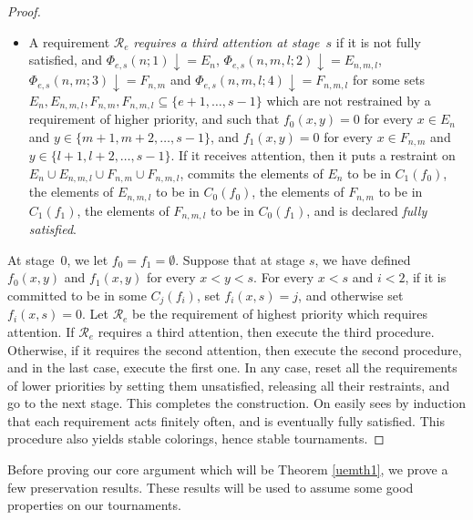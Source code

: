 \documentclass{amsart}
\theoremstyle{definition}
\theoremstyle{remark}
\numberwithin{equation}{section}
\theoremstyle{noparens}
\newcommand{\Rcal}{\mathcal{R}}
\begin{document}
\begin{proof}
\begin{itemize}
	\item[(iii)] A requirement $\Rcal_e$ \emph{requires a third attention at stage~$s$}
	if it is not fully satisfied, and $\Phi_{e,s}(n;1) \downarrow = E_n$, $\Phi_{e,s}(n, m, l;2) \downarrow = E_{n,m,l}$, $\Phi_{e,s}(n,m;3) \downarrow = F_{n,m}$ and $\Phi_{e,s}(n,m,l;4) \downarrow = F_{n,m,l}$
	for some sets $E_n, E_{n,m,l}, F_{n,m}, F_{n,m,l} \subseteq \{e+1, \dots, s-1\}$ which are not restrained	by a requirement of higher priority, and such that $f_0(x, y) = 0$ for every $x \in E_n$ and $y \in \{m+1, m+2, \dots, s-1\}$, and $f_1(x, y) = 0$ for every $x \in F_{n,m}$ and $y \in \{l+1, l+2, \dots, s-1 \}$.
	If it receives attention,
	then it puts a restraint on $E_n \cup E_{n,m,l} \cup F_{n,m} \cup F_{n,m,l}$, commits the elements of $E_n$ to be in $C_1(f_0)$,
	the elements of $E_{n,m,l}$ to be in $C_0(f_0)$,
	the elements of $F_{n,m}$ to be in $C_1(f_1)$,
	the elements of $F_{n,m,l}$ to be in $C_0(f_1)$, and is declared \emph{fully satisfied}.
\end{itemize}
At stage~0, we let $f_0 = f_1 = \emptyset$.
Suppose that at stage $s$, we have defined $f_0(x, y)$ and $f_1(x, y)$ for every $x < y < s$.
For every $x < s$ and $i < 2$, if it is committed to be in some $C_j(f_i)$, set $f_i(x, s) = j$,
and otherwise set $f_i(x, s) = 0$.
Let $\Rcal_e$ be the requirement of highest priority which requires attention.
If $\Rcal_e$ requires a third attention,
then execute the third procedure. Otherwise, if it requires the second attention, then execute the second procedure, and in the last case, execute the first one.
In any case, reset all the requirements of lower priorities by setting them unsatisfied,
releasing all their restraints, and go to the next stage.
This completes the construction.
On easily sees by induction that each requirement acts finitely often, and is eventually
fully satisfied. This procedure also yields stable colorings, hence stable tournaments.
\end{proof}

Before proving our core argument which will be Theorem \ref{uemth1}, we prove a few preservation results. These results will be used to assume some good properties on our tournaments.
\end{document}
